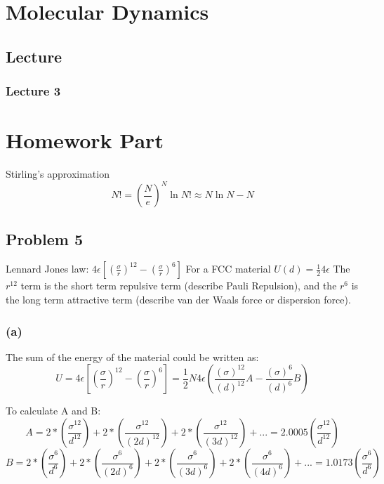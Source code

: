\documentclass[a4paper]{article}
\begin{document}
\section{Molecular Dynamics}
\subsection{Lecture}
\subsubsection{Lecture 3}

\bigskip
\section{Homework Part}
Stirling's approximation 
\begin{equation}
	N! = (\frac{N}{e})^{N}
	\ln N! \approx N\ln N- N
\end{equation}
\subsection{Problem 5}
Lennard Jones law: $4 \epsilon [(\frac{\sigma}{r})^{12}-(\frac{\sigma}{r})^{6}]$
For a FCC material $U(d)=\frac{1}{2} 4 \epsilon $
\newline
The $r^{12}$ term is the short term repulsive term (describe Pauli Repulsion), and the $r^{6}$ is the long term attractive term (describe van der Waals force or dispersion force).

\subsubsection{(a)}
The sum of the energy of the material could be written as: 
\begin{equation}
	U=4\epsilon [(\frac{\sigma}{r})^{12}-(\frac{\sigma}{r})^{6}]=\frac{1}{2}N 4\epsilon (\frac{(\sigma)^{12}}{(d)^{12}}A-\frac{(\sigma)^{6}}{(d)^{6}}B)
\end{equation}

To calculate A and B:
\begin{equation}
	A=2*(\frac{\sigma^{12}}{d^{12}}) + 2*(\frac{\sigma^{12}}{(2d)^{12}}) + 2*(\frac{\sigma^{12}}{(3d)^{12}})+...=2.0005 (\frac{\sigma^{12}}{d^{12}})
\end{equation}
\begin{equation}
	B=2*(\frac{\sigma^{6}}{d^{6}}) + 2*(\frac{\sigma^{6}}{(2d)^{6}}) + 2*(\frac{\sigma^{6}}{(3d)^{6}})+2*(\frac{\sigma^{6}}{(4d)^{6}})+... = 1.0173 (\frac{\sigma^{6}}{d^{6}})
\end{equation}
\end{document}
